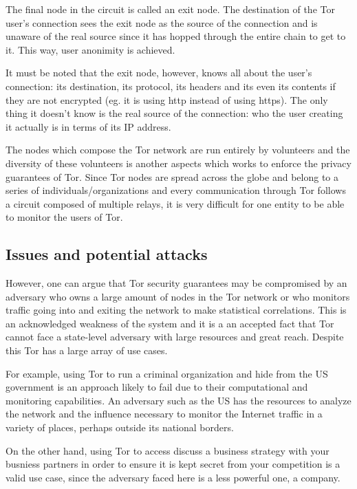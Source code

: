 \documentclass[11pt]{book} %
\begin{document}

The final node in the circuit is called an exit node. The destination of the Tor user's connection sees the exit node as the source of the connection and is unaware of the real source since it has hopped through the entire chain to get to it. This way, user anonimity is achieved.

It must be noted that the exit node, however, knows all about the user's connection: its destination, its protocol, its headers and its even its contents if they are not encrypted (eg. it is using http instead of using https). The only thing it doesn't know is the real source of the connection: who the user creating it actually is in terms of its IP address. 


The nodes which compose the Tor network are run entirely by volunteers and the diversity of these volunteers is another aspects which works to enforce the privacy guarantees of Tor. Since Tor nodes are spread across the globe and belong to a series of individuals/organizations and every communication through Tor follows a circuit composed of multiple relays, it is very difficult for one entity to be able to monitor the users of Tor.

\subsection{Issues and potential attacks}

However, one can argue that Tor security guarantees may be compromised by an adversary who owns a large amount of nodes in the Tor network or who monitors traffic going into and exiting the network to make statistical correlations. This is an acknowledged weakness of the system and it is a an accepted fact that Tor cannot face a state-level adversary with large resources and great reach. Despite this Tor has a large array of use cases.

For example, using Tor to run a criminal organization and hide from the US government is an approach likely to fail due to their computational and monitoring capabilities. An adversary such as the US has the resources to analyze the network and the influence necessary to monitor the Internet traffic in a variety of places, perhaps outside its national borders.

On the other hand, using Tor to access discuss a business strategy with your busniess partners in order to ensure it is kept secret from your competition is a valid use case, since the adversary faced here is a less powerful one, a company.
\end{document}
